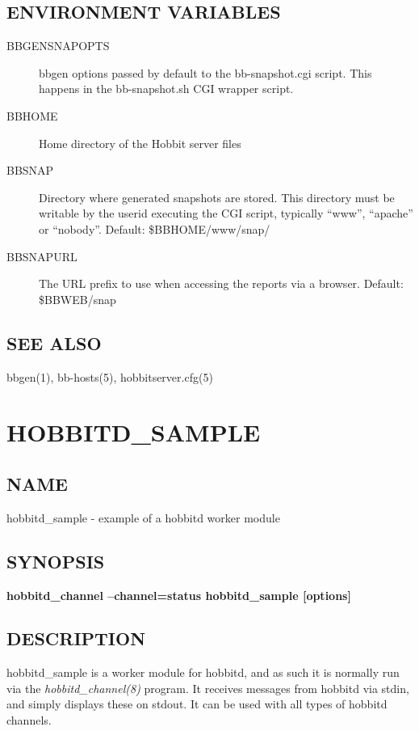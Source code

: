 \subsection{ENVIRONMENT VARIABLES}
\begin{description}
\item[BBGENSNAPOPTS] bbgen options passed by default to the
  bb-snapshot.cgi script. This happens in the bb-snapshot.sh CGI
  wrapper script. 

\item[BBHOME] Home directory of the Hobbit server files 
\item[BBSNAP] Directory where generated snapshots are stored. This
  directory must be writable by the userid executing the CGI script,
  typically ``www'', ``apache'' or ``nobody''. Default:
  \$BBHOME/www/snap/ 

\item[BBSNAPURL] The URL prefix to use when accessing the reports via
  a browser. Default: \$BBWEB/snap 



\end{description}
\subsection{SEE ALSO}
bbgen(1), bb-hosts(5), hobbitserver.cfg(5) 


%
\newpage
\section{HOBBITD\_SAMPLE}
\subsection{NAME}
 hobbitd\_sample - example of a hobbitd worker module \subsection{SYNOPSIS}
\textbf{hobbitd\_channel --channel=status hobbitd\_sample [options]}

 
\subsection{DESCRIPTION}
 hobbitd\_sample is a worker module for hobbitd, and as such it is
 normally run via the \emph{hobbitd\_channel(8)} program. It receives
 messages from hobbitd via stdin, and simply displays these on
 stdout. It can be used with all types of hobbitd channels. 


